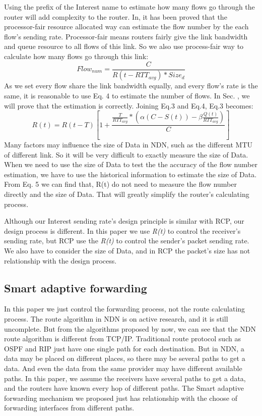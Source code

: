 Using the prefix of the Interest name to estimate how many flows go through the router will add complexity to the router. In\cite{RCP}, it has been proved that the processor-fair resource allocated way can estimate the flow number by the each flow's sending rate. Processor-fair means routers fairly give the link bandwidth and queue resource to all flows of this link. So we also use process-fair way to calculate how many flows go through this link:
\begin{equation}
Flow_{num}=\frac{C}{R(t-RTT_{avg})\ast{Size_{d}}}
\end{equation}
As we set every flow share the link bandwidth equally, and every flow's rate is the same, it is reasonable to use Eq. 4 to estimate the number of flows. In Sec. \uppercase\expandafter{}, we will prove that the estimation is correctly.
Joining Eq.3 and Eq.4, Eq.3 becomes:
\begin{equation}
R(t)=R(t-T)[1+\frac{\frac{T}{RTT_{avg}}\ast(\alpha(C-S(t))-\beta\frac{Q(t)}{RTT_{avg}})}{C}]
\end{equation}
Many factors may influence the size of Data in NDN, such as the different MTU of different link. So it will be very difficult to exactly measure the size of Data. When we need to use the size of Data to test the the accuracy of the flow number estimation, we have to use the historical information to estimate the size of Data. From Eq. 5 we can find that, R(t) do not need to measure the flow number directly and the size of Data. That will greatly simplify the router's calculating process.

Although our Interest sending rate's design principle is similar with RCP\cite{RCP}, our design process is different. In this paper we use \emph{R(t)} to control the receiver's sending rate, but RCP use the \emph{R(t)} to control the sender's packet sending rate. We also have to consider the size of Data, and in RCP the packet's size has not relationship with the design process.
\subsection{Smart adaptive forwarding}
In this paper we just control the forwarding process, not the route calculating process. The route algorithm in NDN is on active research, and it is still uncomplete. But from the algorithms proposed by now, we can see that the NDN route algorithm is different from TCP/IP\cite{ndnroute}. Traditional route protocol such as OSPF and RIP just have one single path for each destination. But in NDN, a data may be placed on different places, so there may be several paths to get a data. And even the data from the same provider may have different available paths. In this paper, we assume the receivers have several paths to get a data, and the routers have known every hop of different paths. The Smart adaptive forwarding mechanism we proposed just has relationship with the choose of forwarding interfaces from different paths.

